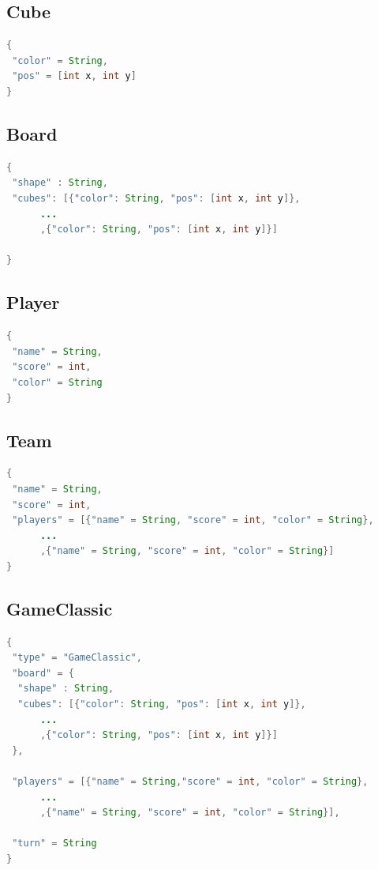 \documentclass[12pt,a4paper,openright]{book}
\theoremstyle{break}
\begin{document}
\subsection*{Cube}

\begin{lstlisting}[frame=single, language=Java]
{
 "color" = String,
 "pos" = [int x, int y]
}
\end{lstlisting}

\subsection*{Board}
\begin{lstlisting}[frame=single, language=Java]
{
 "shape" : String,
 "cubes": [{"color": String, "pos": [int x, int y]},
 	  ...
 	  ,{"color": String, "pos": [int x, int y]}]

}
\end{lstlisting}

\subsection*{Player}

\begin{lstlisting}[frame=single, language=Java]
{
 "name" = String,
 "score" = int,
 "color" = String
}
\end{lstlisting}

\subsection*{Team}

\begin{lstlisting}[frame=single, language=Java]
{
 "name" = String,
 "score" = int,
 "players" = [{"name" = String, "score" = int, "color" = String},
 	  ...
 	  ,{"name" = String, "score" = int, "color" = String}]
}
\end{lstlisting}

\newpage

\subsection*{GameClassic}
\begin{lstlisting}[frame=single, language=Java]
{
 "type" = "GameClassic",
 "board" = {
  "shape" : String,
  "cubes": [{"color": String, "pos": [int x, int y]},
  	  ...
  	  ,{"color": String, "pos": [int x, int y]}]
 },
 
 "players" = [{"name" = String,"score" = int, "color" = String},
 	  ...
 	  ,{"name" = String, "score" = int, "color" = String}],
 
 "turn" = String	
}
\end{lstlisting}
\end{document}
